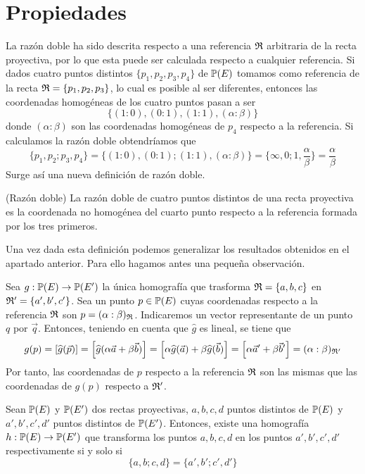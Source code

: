 \section{Propiedades}
La razón doble ha sido descrita respecto a una referencia $\mathfrak{R}$ arbitraria de la recta proyectiva, por lo que esta puede ser calculada respecto a cualquier referencia. Si dados cuatro puntos distintos $\{p_1,p_2,p_3,p_4\}$ de $\mathbb{P}(E)$ tomamos como referencia de la recta $\mathfrak{R}=\{p_1,p_2,p_3\}$, lo cual es posible al ser diferentes, entonces las coordenadas homogéneas de los cuatro puntos pasan a ser
\begin{equation*}
	\{(1:0),(0:1),(1:1),(\alpha:\beta)\}
\end{equation*}
donde $(\alpha:\beta)$ son las coordenadas homogéneas de $p_4$ respecto a la referencia. Si calculamos la razón doble obtendríamos que 
\begin{equation}
	\{p_1,p_2;p_3,p_4\}=\{(1:0),(0:1);(1:1),(\alpha:\beta)\}=\{\infty,0;1,\frac{\alpha}{\beta}\}=\frac{\alpha}{\beta}
\end{equation}
Surge así una nueva definición de razón doble.
\begin{defi}(Razón doble)
	La razón doble de cuatro puntos distintos de una recta proyectiva es la coordenada no homogénea del cuarto punto respecto a la referencia formada por los tres primeros.
\end{defi}
Una vez dada esta definición podemos generalizar los resultados obtenidos en el apartado anterior. Para ello hagamos antes una pequeña observación.
\begin{obs}
	\label{C5_obs_coordenadas_p_g(p)}
	Sea $g:\mathbb{P}(E)\rightarrow \mathbb{P}(E')$ la única homografía que trasforma $\mathfrak{R}=\{a,b,c\}$ en $\mathfrak{R'}=\{a',b',c'\}$. Sea un punto $p\in \mathbb{P}(E)$ cuyas coordenadas respecto a la referencia $\mathfrak{R}$ son $p=(\alpha:\beta)_{\mathfrak{R}}$. Indicaremos un vector representante de un punto $q$ por $\vec{q}$. Entonces, teniendo en cuenta que $\widehat{g}$ es lineal, se tiene que 
	\begin{equation*}
		g(p)=\left [ \widehat{g}(\vec{p}) \right ]=\left [ \widehat{g}(\alpha \vec{a}+\beta \vec{b}) \right ]=\left [ \alpha \widehat{g}( \vec{a})+\beta \widehat{g}(\vec{b}) \right ]=\left [ \alpha \vec{a}'+\beta \vec{b}' \right ]=(\alpha:\beta)_{\mathfrak{R}'}
	\end{equation*}
	Por tanto, las coordenadas de $p$ respecto a la referencia $\mathfrak{R}$ son las mismas que las coordenadas de $g(p)$ respecto a $\mathfrak{R'}$.
\end{obs}
\begin{theo}\label{C5_teo_hom4puntos_sii_razondoble}
	Sean $\mathbb{P}(E)$ y $\mathbb{P}(E')$ dos rectas proyectivas, $a,b,c,d$ puntos distintos de $\mathbb{P}(E)$ y $a',b',c',d'$ puntos distintos de $\mathbb{P}(E')$. Entonces, existe una homografía $h:\mathbb{P}(E)\rightarrow \mathbb{P}(E')$ que transforma los puntos $a,b,c,d$ en los puntos $a',b',c',d'$ respectivamente si y solo si 
	\begin{equation*}
		\{a,b;c,d\}=\{a',b';c',d'\}
	\end{equation*}
\end{theo}
